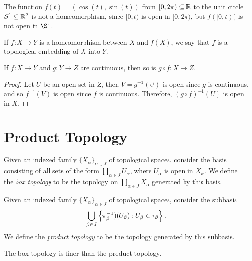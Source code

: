 \begin{exmp}
    The function $f(t) = (\cos(t), \sin(t))$ from $[0, 2\pi) \subseteq \mathbb{R}$ to the unit circle $S^1 \subseteq \mathbb{R}^2$ is not a homeomorphism, since $[0, t)$ is open in $[0, 2\pi)$, but $f([0, t))$ is not open in $\S^1$.
\end{exmp}

\begin{defn}
    If $f: X \to Y$ is a homeomorphism between $X$ and $f(X)$, we say that $f$ is a topological embedding of $X$ into $Y$.
\end{defn}

\begin{thm}
    If $f: X \to Y$ and $g: Y \to Z$ are continuous, then so is $g \circ f: X \to Z$.
\end{thm}

\begin{proof}
    Let $U$ be an open set in $Z$, then $V = g^{-1}(U)$ is open since $g$ is continuous, and so $f^{-1}(V)$ is open since $f$ is continuous. Therefore, $(g \circ f)^{-1}(U)$ is open in $X$.
\end{proof}

\section{Product Topology}

\begin{defn}
    Given an indexed family $\{X_{\alpha}\}_{\alpha\in J}$ of topological spaces, consider the basis consisting of all sets of the form $\prod_{\alpha\in J}U_{\alpha}$, where $U_{\alpha}$ is open in $X_{\alpha}$. We define the \emph{box topology} to be the topology on $\prod_{\alpha\in J}X_{\alpha}$ generated by this basis.
\end{defn}

\begin{defn}
    Given an indexed family $\{X_{\alpha}\}_{\alpha\in J}$ of topological spaces, consider the subbasis
    \begin{align*}
        \bigcup_{\beta\in J}\left\{\pi_{\beta}^{-1})(U_{\beta}) : U_{\beta} \in \tau_{\beta}\right\}.
    \end{align*}
    We define the \emph{product topology} to be the topology generated by this subbasis.
\end{defn}

\begin{prop}
    The box topology is finer than the product topology.
\end{prop}


